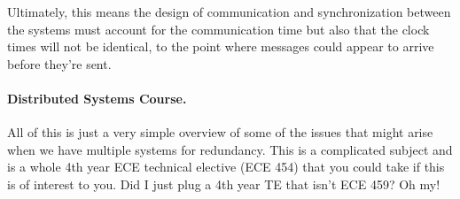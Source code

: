 Ultimately, this means the design of communication and synchronization between the systems must account for the communication time but also that the clock times will not be identical, to the point where messages could appear to arrive before they're sent.


\paragraph{Distributed Systems Course.}
All of this is just a very simple overview of some of the issues that might arise when we have multiple systems for redundancy. This is a complicated subject and is a whole 4th year ECE technical elective (ECE 454) that you could take if this is of interest to you. Did I just plug a 4th year TE that isn't ECE 459? Oh my!




